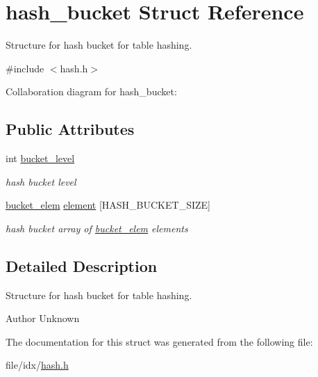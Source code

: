 \hypertarget{structhash__bucket}{\section{hash\+\_\+bucket Struct Reference}
\label{structhash__bucket}
}


Structure for hash bucket for table hashing.  




{\ttfamily \#include $<$hash.\+h$>$}



Collaboration diagram for hash\+\_\+bucket\+:
\subsection*{Public Attributes}
\begin{DoxyCompactItemize}
\item 
\hypertarget{structhash__bucket_a22e1e793b45ac131d377ae2113bf3332}{int \hyperlink{structhash__bucket_a22e1e793b45ac131d377ae2113bf3332}{bucket\+\_\+level}}\label{structhash__bucket_a22e1e793b45ac131d377ae2113bf3332}

\begin{DoxyCompactList}\small\item\em hash bucket level \end{DoxyCompactList}\item 
\hypertarget{structhash__bucket_a0d731c8704ee8499e99165f094efb61f}{\hyperlink{structbucket__elem}{bucket\+\_\+elem} \hyperlink{structhash__bucket_a0d731c8704ee8499e99165f094efb61f}{element} \mbox{[}H\+A\+S\+H\+\_\+\+B\+U\+C\+K\+E\+T\+\_\+\+S\+I\+Z\+E\mbox{]}}\label{structhash__bucket_a0d731c8704ee8499e99165f094efb61f}

\begin{DoxyCompactList}\small\item\em hash bucket array of \hyperlink{structbucket__elem}{bucket\+\_\+elem} elements \end{DoxyCompactList}\end{DoxyCompactItemize}


\subsection{Detailed Description}
Structure for hash bucket for table hashing. 

\begin{DoxyAuthor}{Author}
Unknown 
\end{DoxyAuthor}


The documentation for this struct was generated from the following file\+:\begin{DoxyCompactItemize}
\item 
file/idx/\hyperlink{hash_8h}{hash.\+h}\end{DoxyCompactItemize}
